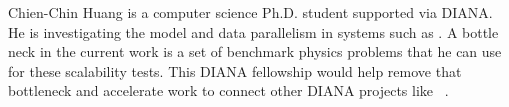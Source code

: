 Chien-Chin Huang is a computer science Ph.D. student supported via DIANA.
He is investigating the model and data parallelism in systems such as .
A bottle neck in the current work is a set of benchmark physics problems that he can use for these scalability tests.
This DIANA fellowship would help remove that bottleneck and accelerate work to connect other DIANA projects like ~\cite{histogrammar2017}.
